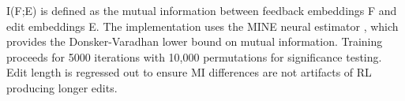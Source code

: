 
I(F;E) is defined as the mutual information between feedback embeddings F and edit embeddings E. The implementation uses the MINE neural estimator \citep{belghazi2018mine}, which provides the Donsker-Varadhan lower bound on mutual information. Training proceeds for 5000 iterations with 10,000 permutations for significance testing. Edit length is regressed out to ensure MI differences are not artifacts of RL producing longer edits.
